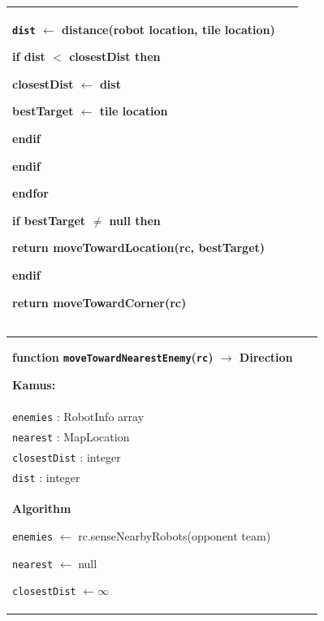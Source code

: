 \documentclass{article}
\newenvironment{pseudobox}
{
\centering
\begin{longtable}{|p{0.94\linewidth}|}
\hline
}
{
\\ \hline
\end{longtable}
\vspace{0.05cm}
}
\begin{document}
\begin{enumerate}[label=\alph*.]
\begin{pseudobox}
\hspace*{4.5em}\texttt{dist} $\leftarrow$ distance(robot location, tile location)

\hspace*{4.5em}if dist $<$ closestDist then

\hspace*{6em}closestDist $\leftarrow$ dist

\hspace*{6em}bestTarget $\leftarrow$ tile location

\hspace*{4.5em}endif

\hspace*{3em}endif

\hspace*{1.5em}endfor

\hspace*{1.5em}if bestTarget $\neq$ null then

\hspace*{3em}return moveTowardLocation(rc, bestTarget)

\hspace*{1.5em}endif

\hspace*{1.5em}return moveTowardCorner(rc)
\end{pseudobox}

\begin{pseudobox}
\textbf{function \texttt{moveTowardNearestEnemy}(\texttt{rc}) $\rightarrow$ Direction}

\textbf{Kamus:} \\
\hspace*{1.5em}\texttt{enemies} : RobotInfo array \\
\hspace*{1.5em}\texttt{nearest} : MapLocation \\
\hspace*{1.5em}\texttt{closestDist} : integer \\
\hspace*{1.5em}\texttt{dist} : integer \\

\textbf{Algorithm}

\hspace*{1.5em}\texttt{enemies} $\leftarrow$ rc.senseNearbyRobots(opponent team)

\hspace*{1.5em}\texttt{nearest} $\leftarrow$ null

\hspace*{1.5em}\texttt{closestDist} $\leftarrow \infty$


\end{pseudobox}
\end{enumerate}
\end{document}
